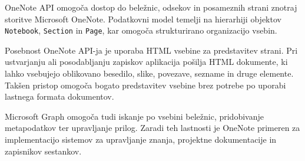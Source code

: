 \documentclass[a4paper, 12pt]{book}
\begin{document}
OneNote API omogoča dostop do beležnic, odsekov in posameznih strani znotraj storitve Microsoft OneNote. Podatkovni model temelji na hierarhiji objektov \texttt{Notebook}, \texttt{Section} in \texttt{Page}, kar omogoča strukturirano organizacijo vsebin.

Posebnost OneNote API-ja je uporaba HTML vsebine za predstavitev strani. Pri ustvarjanju ali posodabljanju zapiskov aplikacija pošilja HTML dokumente, ki lahko vsebujejo oblikovano besedilo, slike, povezave, sezname in druge elemente. Takšen pristop omogoča bogato predstavitev vsebine brez potrebe po uporabi lastnega formata dokumentov.

Microsoft Graph omogoča tudi iskanje po vsebini beležnic, pridobivanje metapodatkov ter upravljanje prilog. Zaradi teh lastnosti je OneNote primeren za implementacijo sistemov za upravljanje znanja, projektne dokumentacije in zapisnikov sestankov.
\end{document}

